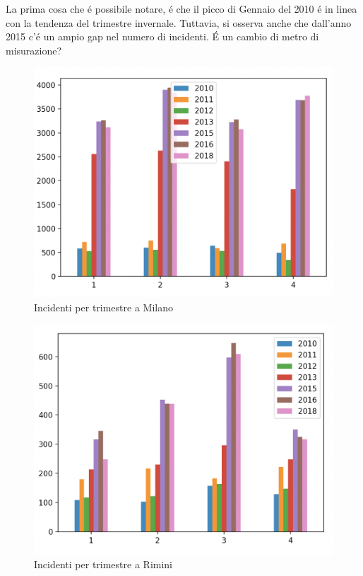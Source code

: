 \documentclass[a4paper]{report}
\begin{document}
La prima cosa che \'e possibile notare, \'e che il picco di Gennaio del 2010 \'e 
in linea con la tendenza del trimestre invernale. 
Tuttavia, si osserva anche che dall'anno 2015 c'\'e un ampio gap nel numero di 
incidenti. 
\'E un cambio di metro di misurazione? 

\begin{figure}[!ht]
    \includegraphics[width=\linewidth]{../src/incidenti/incidenti_senza_coords/mese_incidenti/milano_trimestre.png}
    \caption{Incidenti per trimestre a Milano}
    \label{fig:milano_trimestre}
\end{figure}

\begin{figure}[!ht]
    \includegraphics[width=\linewidth]{../src/incidenti/incidenti_senza_coords/mese_incidenti/rimini_trimestre.png}
    \caption{Incidenti per trimestre a Rimini}
    \label{fig:rimini_trimestre}
\end{figure}
\end{document}
